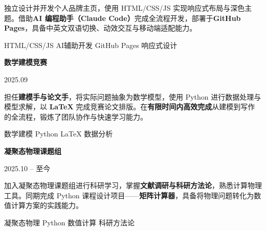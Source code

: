 \documentclass[10pt,a4paper]{ctexart}
\begin{document}
\vspace{2pt}
{\small 独立设计并开发个人品牌主页，使用 HTML/CSS/JS 实现响应式布局与深色主题。借助\textbf{AI 编程助手（Claude Code）}完成全流程开发，部署于\textbf{GitHub Pages}，具备中英文双语切换、动效交互与移动端适配能力。}

\vspace{4pt}
{\footnotesize\color{accent} \faTags\enspace HTML/CSS/JS \quad AI辅助开发 \quad GitHub Pages \quad 响应式设计}

\vspace{8pt}
\noindent
\begin{minipage}[t]{0.78\textwidth}
  \textbf{数学建模竞赛} 
\end{minipage}
\hfill
\begin{minipage}[t]{0.2\textwidth}
  \begin{flushright}
    {\small\color{textgray} 2025.09}
  \end{flushright}
\end{minipage}

\vspace{2pt}
{\small 担任\textbf{建模手与论文手}，将实际问题抽象为数学模型，使用 Python 进行数据处理与模型求解，以 \textbf{LaTeX} 完成竞赛论文排版。在\textbf{有限时间内高效完成}从建模到写作的全流程，锻炼了团队协作与快速学习能力。}

\vspace{4pt}
{\footnotesize\color{accent} \faTags\enspace 数学建模 \quad Python \quad LaTeX \quad 数据分析}

\vspace{8pt}
\noindent
\begin{minipage}[t]{0.78\textwidth}
  \textbf{凝聚态物理课题组} 
\end{minipage}
\hfill
\begin{minipage}[t]{0.2\textwidth}
  \begin{flushright}
    {\small\color{textgray} 2025.10 -- 至今}
  \end{flushright}
\end{minipage}

\vspace{2pt}
{\small 加入凝聚态物理课题组进行科研学习，掌握\textbf{文献调研与科研方法论}，熟悉计算物理工具。同期完成 Python 课程设计项目——\textbf{矩阵计算器}，具备将物理问题转化为数值计算方案的实践能力。}

\vspace{4pt}
{\footnotesize\color{accent} \faTags\enspace 凝聚态物理 \quad Python \quad 数值计算 \quad 科研方法论}
\end{document}

